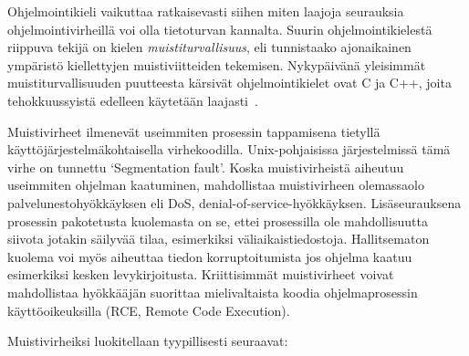 Ohjelmointikieli vaikuttaa ratkaisevasti siihen miten laajoja seurauksia ohjelmointivirheillä voi olla tietoturvan kannalta.
Suurin ohjelmointikielestä riippuva tekijä on kielen \emph{muistiturvallisuus},
eli tunnistaako ajonaikainen ympäristö kiellettyjen muistiviitteiden tekemisen.
Nykypäivänä yleisimmät muistiturvallisuuden puutteesta kärsivät ohjelmointikielet ovat C ja C++,
joita tehokkuussyistä edelleen käytetään laajasti~\cite{StaticallyDetecting}.

Muistivirheet ilmenevät useimmiten prosessin tappamisena tietyllä
käyt\-tö\-jär\-jes\-tel\-mä\-koh\-tai\-sel\-la virhekoodilla.
Unix-pohjaisissa järjestelmissä tämä virhe on tunnettu `Segmentation fault'.
Koska muistivirheistä aiheutuu useimmiten ohjelman kaatuminen,
mahdollistaa muistivirheen olemassaolo palvelunestohyökkäyksen eli DoS, denial-of-service-hyökkäyksen.
Lisäseurauksena prosessin pakotetusta kuolemasta on se,
ettei prosessilla ole mahdollisuutta siivota jotakin säilyvää tilaa,
esimerkiksi väliaikaistiedostoja.
Hallitsematon kuolema voi myös aiheuttaa tiedon korruptoitumista jos ohjelma kaatuu esimerkiksi kesken levykirjoitusta.
Kriittisimmät muistivirheet voivat mahdollistaa hyökkääjän suorittaa mielivaltaista koodia ohjelmaprosessin käyttöoikeuksilla (RCE, Remote Code Execution).

Muistivirheiksi luokitellaan tyypillisesti seuraavat:

